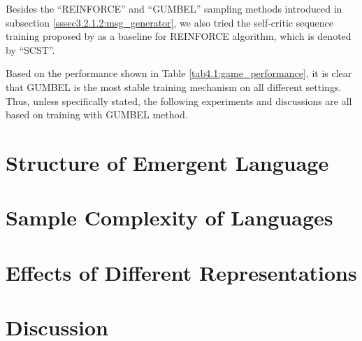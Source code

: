 Besides the ``REINFORCE'' and ``GUMBEL'' sampling methods introduced in subsection \ref{sssec3.2.1.2:msg_generator}, we also tried the self-critic sequence training proposed by \cite{rennie2017self} as a baseline for REINFORCE algorithm, which is denoted by ``SCST''.

Based on the performance shown in Table \ref{tab4.1:game_performance}, it is clear that GUMBEL is the most stable training mechanism on all different settings. Thus, unless specifically stated, the following experiments and discussions are all based on training with GUMBEL method.

\section{Structure of Emergent Language}
\label{sec4.2:structure_emergent_lan}

\section{Sample Complexity of Languages}
\label{sec4.3:sample_complexity}

\section{Effects of Different Representations}
\label{sec4.4:represent_effect}

\section{Discussion}
\label{sec4.5:discuss}